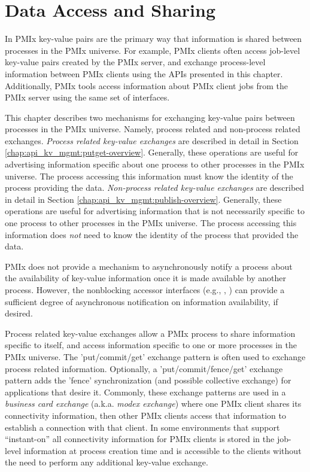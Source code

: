 \chapter{Data Access and Sharing}
\label{chap:api_sync_acc}

In \ac{PMIx} key-value pairs are the primary way that information is shared between processes in the \ac{PMIx} universe.
For example, \ac{PMIx} clients often access job-level key-value pairs created by the \ac{PMIx} server, and exchange
process-level information between \ac{PMIx} clients using the APIs presented in this chapter.
Additionally, \ac{PMIx} tools access information about \ac{PMIx} client jobs from the \ac{PMIx} server using the
same set of interfaces.

This chapter describes two mechanisms for exchanging key-value pairs between processes in the \ac{PMIx} universe.
Namely, process related and non-process related exchanges.
\emph{Process related key-value exchanges} are described in detail in Section \ref{chap:api_kv_mgmt:putget-overview}.
Generally, these operations are useful for advertising information specific about one process to other processes in the \ac{PMIx} universe.
The process accessing this information must know the identity of the process providing the data.
\emph{Non-process related key-value exchanges} are described in detail in Section \ref{chap:api_kv_mgmt:publish-overview}.
Generally, these operations are useful for advertising information that is not necessarily specific to one process to other processes in the \ac{PMIx} universe.
The process accessing this information does \emph{not} need to know the identity of the process that provided the data.

\ac{PMIx} does not provide a mechanism to asynchronously notify a process about the availability of key-value information once it is made available by another process.
However, the nonblocking accessor interfaces (e.g., , ) can provide a sufficient degree of asynchronous notification on information availability, if desired.

Process related key-value exchanges allow a \ac{PMIx} process to share information specific to itself, and access information specific to one or more processes in the \ac{PMIx} universe.
The 'put/commit/get' exchange pattern is often used to exchange process related information.
Optionally, a 'put/commit/fence/get' exchange pattern adds the 'fence' synchronization (and possible collective exchange) for applications that desire it.
Commonly, these exchange patterns are used in a \emph{business card exchange} (a.k.a. \emph{modex exchange}) where one \ac{PMIx} client shares its connectivity information, then other \ac{PMIx} clients access that information to establish a connection with that client.
In some environments that support ``instant-on'' all connectivity information for \ac{PMIx} clients is stored in the job-level information at process creation time and is accessible to the clients without the need to perform any additional key-value exchange.

